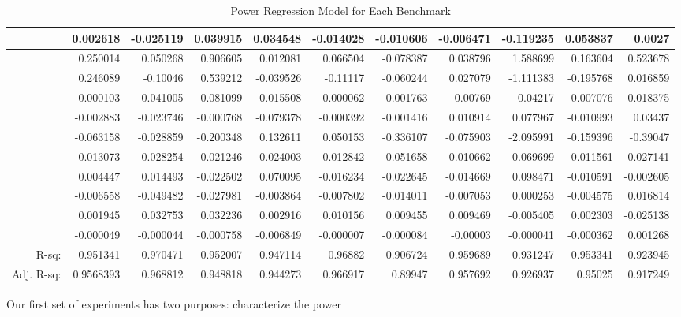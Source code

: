 \documentclass[times, 10pt,onecolumn]{article}
\begin{document}
\begin{table}
\begin{tabular}{|r|r|r|r|r|r|r|r|r|r|r|}
\hline
           &   0.002618 &  -0.025119 &   0.039915 &   0.034548 &  -0.014028 &  -0.010606 &  -0.006471 &  -0.119235 &   0.053837 &     0.0027 \\
\hline
           &   0.250014 &   0.050268 &   0.906605 &   0.012081 &   0.066504 &  -0.078387 &   0.038796 &   1.588699 &   0.163604 &   0.523678 \\
\hline
           &   0.246089 &   -0.10046 &   0.539212 &  -0.039526 &   -0.11117 &  -0.060244 &   0.027079 &  -1.111383 &  -0.195768 &   0.016859 \\
\hline
           &  -0.000103 &   0.041005 &  -0.081099 &   0.015508 &  -0.000062 &  -0.001763 &   -0.00769 &   -0.04217 &   0.007076 &  -0.018375 \\
\hline
           &  -0.002883 &  -0.023746 &  -0.000768 &  -0.079378 &  -0.000392 &  -0.001416 &   0.010914 &   0.077967 &  -0.010993 &    0.03437 \\
\hline
           &  -0.063158 &  -0.028859 &  -0.200348 &   0.132611 &   0.050153 &  -0.336107 &  -0.075903 &  -2.095991 &  -0.159396 &   -0.39047 \\
\hline
           &  -0.013073 &  -0.028254 &   0.021246 &  -0.024003 &   0.012842 &   0.051658 &   0.010662 &  -0.069699 &   0.011561 &  -0.027141 \\
\hline
           &   0.004447 &   0.014493 &  -0.022502 &   0.070095 &  -0.016234 &  -0.022645 &  -0.014669 &   0.098471 &  -0.010591 &  -0.002605 \\
\hline
           &  -0.006558 &  -0.049482 &  -0.027981 &  -0.003864 &  -0.007802 &  -0.014011 &  -0.007053 &   0.000253 &  -0.004575 &   0.016814 \\
\hline
           &   0.001945 &   0.032753 &   0.032236 &   0.002916 &   0.010156 &   0.009455 &   0.009469 &  -0.005405 &   0.002303 &  -0.025138 \\
\hline
           &  -0.000049 &  -0.000044 &  -0.000758 &  -0.006849 &  -0.000007 &  -0.000084 &   -0.00003 &  -0.000041 &  -0.000362 &   0.001268 \\
\hline
     R-sq: &   0.951341 &   0.970471 &   0.952007 &   0.947114 &    0.96882 &   0.906724 &   0.959689 &   0.931247 &   0.953341 &   0.923945 \\
\hline
Adj. R-sq: &  0.9568393 &   0.968812 &   0.948818 &   0.944273 &   0.966917 &    0.89947 &   0.957692 &   0.926937 &    0.95025 &   0.917249 \\
\hline
\end{tabular} 
  \caption{Power Regression Model for Each Benchmark}
  \label{tab:bybench}
\end{table}
Our first set of experiments has two purposes: characterize the power 
\end{document}
